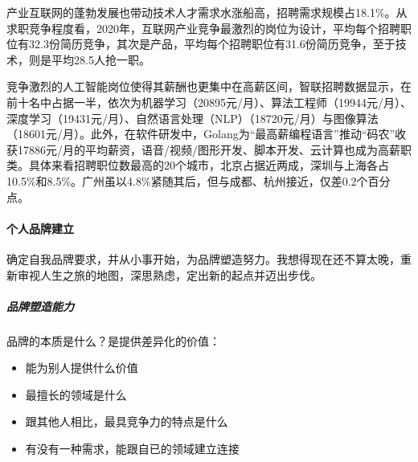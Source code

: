 \documentclass[letterpaper,11pt,english]{sphinxmanual}
\begin{document}
产业互联网的蓬勃发展也带动技术人才需求水涨船高，招聘需求规模占18.1\%。从求职竞争程度看，2020年，互联网产业竞争最激烈的岗位为设计，平均每个招聘职位有32.3份简历竞争，其次是产品，平均每个招聘职位有31.6份简历竞争，至于技术，则是平均28.5人抢一职。

竞争激烈的人工智能岗位使得其薪酬也更集中在高薪区间，智联招聘数据显示，在前十名中占据一半，依次为机器学习（20895元/月）、算法工程师（19944元/月）、深度学习（19431元/月）、自然语言处理（NLP）（18720元/月）与图像算法（18601元/月）。此外，在软件研发中，Golang为“最高薪编程语言”推动“码农”收获17886元/月的平均薪资，语音/视频/图形开发、脚本开发、云计算也成为高薪职类。具体来看招聘职位数最高的20个城市，北京占据近两成，深圳与上海各占10.5\%和8.5\%。广州虽以4.8\%紧随其后，但与成都、杭州接近，仅差0.2个百分点。


\paragraph{个人品牌建立}
\label{\detokenize{chapter_project/AI_talents:id11}}
确定自我品牌要求，并从小事开始，为品牌塑造努力。我想得现在还不算太晚，重新审视人生之旅的地图，深思熟虑，定出新的起点并迈出步伐。


\subparagraph{品牌塑造能力}
\label{\detokenize{chapter_project/AI_talents:id12}}
品牌的本质是什么？是提供差异化的价值：%
\begin{footnote}[673]\sphinxAtStartFootnote
{}
%
\end{footnote}
\begin{itemize}
\item {} 
能为别人提供什么价值

\item {} 
最擅长的领域是什么

\item {} 
跟其他人相比，最具竞争力的特点是什么

\item {} 
有没有一种需求，能跟自已的领域建立连接

\end{itemize}
\end{document}
